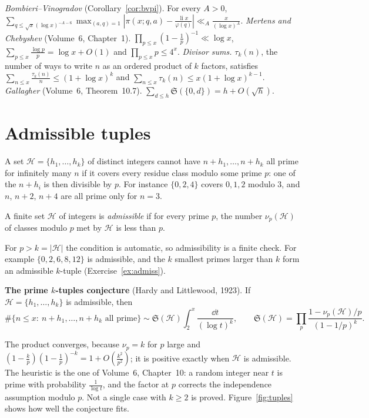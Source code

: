 \begin{reminder}
\emph{Bombieri--Vinogradov} (Corollary~\ref{cor:bvpi}). For every $A>0$, $\sum_{q\le\sqrt x(\log x)^{-A-6}}\max_{(a,q)=1}|\pi(x;q,a)-\frac{\operatorname{li}x}{\varphi(q)}|\ll_A\frac x{(\log x)^A}$.
\emph{Mertens and Chebyshev} (Volume~6, Chapter~1). $\prod_{p\le x}(1-\frac1p)^{-1}\ll\log x$, $\sum_{p\le x}\frac{\log p}p=\log x+O(1)$ and $\prod_{p\le x}p\le4^x$.
\emph{Divisor sums.} $\tau_k(n)$, the number of ways to write $n$ as an ordered product of $k$ factors, satisfies $\sum_{n\le x}\frac{\tau_k(n)}n\le(1+\log x)^k$ and $\sum_{n\le x}\tau_k(n)\le x(1+\log x)^{k-1}$.
\emph{Gallagher} (Volume~6, Theorem~10.7). $\sum_{d\le h}\mathfrak S(\{0,d\})=h+O(\sqrt h)$.
\end{reminder}

\section{Admissible tuples}

A set $\mathcal H=\{h_1,\dots,h_k\}$ of distinct integers cannot have $n+h_1,\dots,n+h_k$ all prime for infinitely many $n$ if it covers every residue class modulo some prime $p$: one of the $n+h_i$ is then divisible by $p$. For instance $\{0,2,4\}$ covers $0,1,2$ modulo $3$, and $n$, $n+2$, $n+4$ are all prime only for $n=3$.

\begin{definition}\label{def:admissible}
A finite set $\mathcal H$ of integers is \emph{admissible} if for every prime $p$, the number $\nu_p(\mathcal H)$ of classes modulo $p$ met by $\mathcal H$ is less than $p$.
\end{definition}

For $p>k=|\mathcal H|$ the condition is automatic, so admissibility is a finite check. For example $\{0,2,6,8,12\}$ is admissible, and the $k$ smallest primes larger than $k$ form an admissible $k$-tuple (Exercise~\ref{ex:admiss}).

\medskip\noindent\textbf{The prime $k$-tuples conjecture} (Hardy and Littlewood, 1923). If $\mathcal H=\{h_1,\dots,h_k\}$ is admissible, then
\[
\#\{n\le x:\ n+h_1,\dots,n+h_k\text{ all prime}\}\sim\mathfrak S(\mathcal H)\int_2^x\frac{\dd t}{(\log t)^k},\qquad\mathfrak S(\mathcal H)=\prod_p\frac{1-\nu_p(\mathcal H)/p}{(1-1/p)^k}.
\]
\medskip

The product converges, because $\nu_p=k$ for $p$ large and $(1-\frac kp)(1-\frac1p)^{-k}=1+O(\frac{k^2}{p^2})$; it is positive exactly when $\mathcal H$ is admissible. The heuristic is the one of Volume~6, Chapter~10: a random integer near $t$ is prime with probability $\frac1{\log t}$, and the factor at $p$ corrects the independence assumption modulo $p$. Not a single case with $k\ge2$ is proved. Figure~\ref{fig:tuples} shows how well the conjecture fits.

